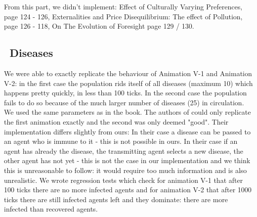 From this part, we didn't implement: Effect of Culturally Varying Preferences, page 124 - 126, Externalities and Price Disequilibrium: The effect of Pollution, page 126 - 118, On The Evolution of Foresight page 129 / 130. 


\subsection{\, Diseases}
We were able to exactly replicate the behaviour of Animation V-1 and Animation V-2: in the first case the population rids itself of all diseases (maximum 10) which happens pretty quickly, in less than 100 ticks. In the second case the population fails to do so because of the much larger number of diseases (25) in circulation. We used the same parameters as in the book. 
The authors of \cite{weaver_replicating_2009} could only replicate the first animation exactly and the second was only deemed "good". Their implementation differs slightly from ours: In their case a disease can be passed to an agent who is immune to it - this is not possible in ours. In their case if an agent has already the disease, the transmitting agent selects a new disease, the other agent has not yet - this is not the case in our implementation and we think this is unreasonable to follow: it would require too much information and is also unrealistic.
We wrote regression tests which check for animation V-1 that after 100 ticks there are no more infected agents and for animation V-2 that after 1000 ticks there are still infected agents left and they dominate: there are more infected than recovered agents.